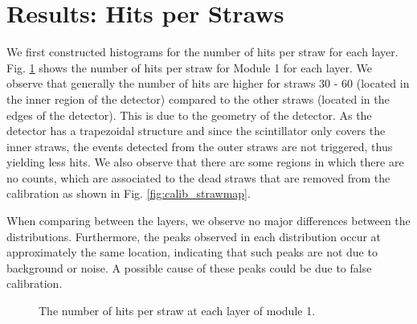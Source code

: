 \documentclass[a4paper]{report}
\numberwithin{equation}{section}
\begin{document}
\section{Results: Hits per Straws}

We first constructed histograms for the number of hits per straw for each layer. Fig. \ref{fig:hitsperstraw_m1_layers} shows the number of hits per straw for 
Module 1 for each layer. We observe that generally the number of hits are higher for straws 30 - 60 (located in the inner region of the 
detector) compared to the other straws (located in the edges of the detector). 
This is due to the geometry of the detector. As the detector has a trapezoidal structure and since the scintillator only covers
the inner straws, the events detected from the outer straws are not triggered, thus yielding less hits. We also observe that there are 
some regions in which there are no counts, which are associated to the dead straws that are removed from the calibration as shown in 
Fig. \ref{fig:calib_strawmap}. \par 

When comparing between the layers, we observe no major differences between the distributions. Furthermore, the peaks observed 
in each distribution occur at approximately the same location, indicating that such peaks are not due to background or noise. 
A possible cause of these peaks could be due to false calibration. 


\begin{figure}[htb!]
	\centering
	\quad
	\centering
	\quad
	\centering
	\caption{The number of hits per straw at each layer of module 1. }
	\label{fig:hitsperstraw_m1_layers}
\end{figure}
\end{document}
